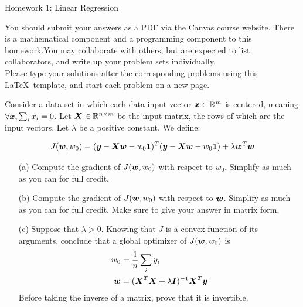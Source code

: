 \documentclass[submit]{harvardml}
\begin{document}
\begin{center}
{\Large Homework 1: Linear Regression}\\
\end{center}
You should submit your answers as a PDF via the Canvas course website.  There is a mathematical component and a programming component to this homework.You may collaborate with others, but are expected to list collaborators, and write up your problem sets individually.\\

\noindent
Please type your solutions after the corresponding problems using this \LaTeX\ template, and start each problem on a new page.\\

\begin{problem}

Consider a data set in which each data input vector $\boldsymbol{x} \in \mathbb{R}^m$ is
centered, meaning $\forall \boldsymbol{x}, \sum_i x_i = 0$. Let $\boldsymbol{X} \in
\mathbb{R}^{n \times m}$ be the input matrix, the rows of which are the input
vectors. Let $\lambda$ be a positive constant. We define:

$$J(\boldsymbol{w}, w_0) = (\boldsymbol{y} - \boldsymbol{X} \boldsymbol{w} - w_0 {\bf 1 })^T (\boldsymbol{y} - \boldsymbol{X}
\boldsymbol{w} - w_0 {\bf 1 }) + \lambda \boldsymbol{w}^T \boldsymbol{w}$$

\begin{itemize}
  \item[(a)] Compute the gradient of $J(\boldsymbol{w}, w_0)$ with respect to $w_0$.
    Simplify as much as you can for full credit.
  \item[(b)] Compute the gradient of $J(\boldsymbol{w}, w_0)$ with respect to $\boldsymbol{w}$.
    Simplify as much as you can for full credit. Make sure to give your answer
    in matrix form.
  \item[(c)] Suppose that $\lambda > 0$. Knowing that $J$ is a convex function
    of its arguments, conclude that a global optimizer of
    $J(\boldsymbol{w}, w_0)$ is
    \begin{align}
      w_0 &= \frac{1}{n} \sum_i y_i \\
      \boldsymbol{w} &= (\boldsymbol{X}^T \boldsymbol{X} + \lambda \boldsymbol{I})^{-1} \boldsymbol{X}^T \boldsymbol{y}
    \end{align}
    Before taking the inverse of a matrix, prove that it is invertible.
\end{itemize}
\end{problem}
\end{document}
